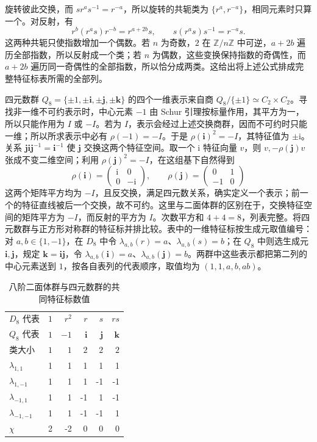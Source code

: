\ProseParagraphBreak
旋转彼此交换，而 \(sr^as^{-1}=r^{-a}\)，所以旋转的共轭类为 \(\{r^a,r^{-a}\}\)，相同元素时只算一个。对反射，有
\[
	r^b(r^as)r^{-b}=r^{a+2b}s,\qquad s(r^as)s^{-1}=r^{-a}s.
\]
这两种共轭只使指数增加一个偶数。若 \(n\) 为奇数，\(2\) 在 \(\mathbb Z/n\mathbb Z\) 中可逆，\(a+2b\) 遍历全部指数，所以反射成一个类；若 \(n\) 为偶数，这些变换保持指数的奇偶性，而 \(a+2b\) 遍历同一奇偶性的全部指数，所以恰分成两类。这给出将上述公式排成完整特征标表所需的全部列。

\ProseParagraphBreak
四元数群 \(Q_8=\{\pm1,\pm\mathbf i,\pm\mathbf j,\pm\mathbf k\}\) 的四个一维表示来自商 \(Q_8/\{\pm1\}\simeq C_2\times C_2\)。寻找非一维不可约表示时，中心元素 \(-1\) 由 Schur 引理按标量作用，其平方为一，所以只能作用为 \(I\) 或 \(-I\)。若为 \(I\)，表示会经过上述交换商群，因而不可约时只能一维；所以所求表示中必有 \(\rho(-1)=-I\)。于是 \(\rho(\mathbf i)^2=-I\)，其特征值为 \(\pm\mathrm i\)。关系 \(\mathbf j\mathbf i\mathbf j^{-1}=\mathbf i^{-1}\) 使 \(\mathbf j\) 交换这两个特征空间。取一个 \(\mathrm i\) 特征向量 \(v\)，则 \(v,-\rho(\mathbf j)v\) 张成不变二维空间；利用 \(\rho(\mathbf j)^2=-I\)，在这组基下自然得到
\[
	\rho(\mathbf i)=\begin{pmatrix}\mathrm i&0\\0&-\mathrm i\end{pmatrix},
	\qquad
	\rho(\mathbf j)=\begin{pmatrix}0&1\\-1&0\end{pmatrix}
\]
这两个矩阵平方均为 \(-I\)，且反交换，满足四元数关系，确实定义一个表示；前一个的特征直线被后一个交换，故不可约。这里与二面体群的区别在于，交换特征空间的矩阵平方为 \(-I\)，而反射的平方为 \(I\)。次数平方和 \(4+4=8\)，列表完整。将四元数群与正方形对称群的特征标并排比较。表中的一维特征标按生成元取值编号：对 \(a,b\in\{1,-1\}\)，在 \(D_8\) 中令 \(\lambda_{a,b}(r)=a\)、\(\lambda_{a,b}(s)=b\)；在 \(Q_8\) 中则选生成元 \(\mathbf i,\mathbf j\)，规定 \(\mathbf k=\mathbf i\mathbf j\)，令 \(\lambda_{a,b}(\mathbf i)=a\)、\(\lambda_{a,b}(\mathbf j)=b\)。两群中这些表示都把第二列的中心元素送到 \(1\)，按各自表列的代表顺序，取值均为 \((1,1,a,b,ab)\)。

\begin{table}[htbp]
	\centering
	\caption{八阶二面体群与四元数群的共同特征标数值}
	\label{b5:tab:d8-q8}
	\begin{tabular}{lrrrrr}
		\toprule
		\(D_8\) 代表 & \(1\)&\(r^2\)&\(r\)&\(s\)&\(rs\)\\
		\(Q_8\) 代表 & \(1\)&\(-1\)&\(\mathbf i\)&\(\mathbf j\)&\(\mathbf k\)\\
		类大小 & \(1\)&\(1\)&\(2\)&\(2\)&\(2\)\\
		\midrule
		\(\lambda_{1,1}\)&1&1&1&1&1\\
		\(\lambda_{1,-1}\)&1&1&1&-1&-1\\
		\(\lambda_{-1,1}\)&1&1&-1&1&-1\\
		\(\lambda_{-1,-1}\)&1&1&-1&-1&1\\
		\(\chi\)&2&-2&0&0&0\\
		\bottomrule
	\end{tabular}
\end{table}

